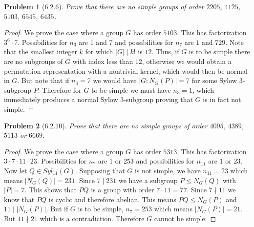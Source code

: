 \documentclass{article}
\newtheorem{problem}{Problem}
\begin{document}
\begin{problem}[6.2.6]
Prove that there are no simple groups of order $2205$, $4125$, $5103$, $6545$, $6435$.
\end{problem}
\begin{proof}
We prove the case where a group $G$ has order $5103$. This has factorization $3^6 \cdot 7$. Possibilities for $n_3$ are $1$ and $7$ and possibilities for $n_7$ are $1$ and $729$. Note that the smallest integer $k$ for which $|G| \mid k!$ is $12$. Thus, if $G$ is to be simple there are no subgroups of $G$ with index less than $12$, otherwise we would obtain a permutation representation with a nontrivial kernel, which would then be normal in $G$. But note that if $n_3 = 7$ we would have $|G : N_G(P)| = 7$ for some Sylow $3$-subgroup $P$. Therefore for $G$ to be simple we must have $n_3 = 1$, which immediately produces a normal Sylow $3$-subgroup proving that $G$ is in fact not simple.
\end{proof}

\begin{problem}[6.2.10]
Prove that there are no simple groups of order $4095$, $4389$, $5113$ or $6669$.
\end{problem}
\begin{proof}
We prove the case where a group $G$ has order $5313$. This has factorization $3 \cdot 7 \cdot 11 \cdot 23$. Possibilities for $n_7$ are $1$ or $253$ and possibilities for $n_11$ are $1$ or $23$. Now let $Q \in Syl_11(G)$. Supposing that $G$ is not simple, we have $n_11 = 23$ which means $|N_G(Q)| = 231$. Since $7 \mid 231$ we have a subgroup $P \leq N_G(Q)$ with $|P| = 7$. This shows that $PQ$ is a group with order $7 \cdot 11 = 77$. Since $7 \nmid 11$ we know that $PQ$ is cyclic and therefore abelian. This means $PQ \leq N_G(P)$ and $11 \mid |N_G(P)|$. But if $G$ is to be simple, $n_7 = 253$ which means $|N_G(P)| = 21$. But $11 \nmid 21$ which is a contradiction. Therefore $G$ cannot be simple.
\end{proof}
\end{document}
